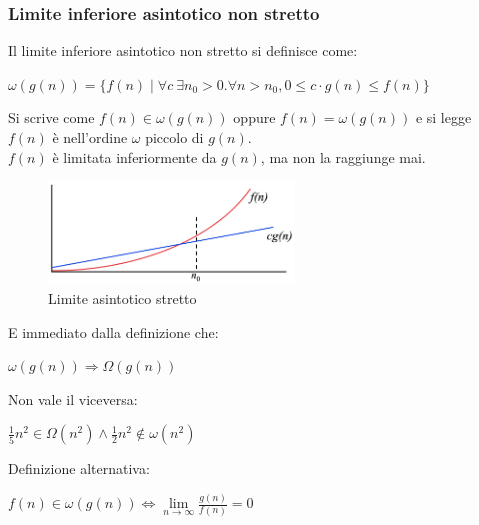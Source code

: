 \subsubsection{Limite inferiore asintotico non stretto}
\begin{definition}
	Il limite inferiore asintotico non stretto si definisce come:
	\begin{center}
		$\omega(g(n)) = \{f(n) \mid \forall c \: \exists n_0 > 0 . \forall n > n_0, 0 \leq c \cdot g(n) \leq f(n) \}$
	\end{center}
\end{definition}
\noindent Si scrive come $f(n) \in \omega(g(n))$ oppure $f(n) = \omega(g(n))$ e si legge $f(n)$ è nell'ordine $\omega$ piccolo di $g(n)$.\\
$f(n)$ è limitata inferiormente da $g(n)$, ma non la raggiunge mai.\\
\begin{figure}
	\vspace{-15pt}
	\centering
	\includegraphics[width=6.5cm]{images/limite-inferiore-asintotico-non-stretto.png}
	\vspace{-5pt}
	\caption{Limite asintotico stretto}
\end{figure}

\vspace{-15pt}
E immediato dalla definizione che:
\begin{center}
	$\omega(g(n)) \Longrightarrow \Omega(g(n))$
\end{center}
Non vale il viceversa: 
\begin{center}
	$\frac{1}{5}n^2 \in \Omega(n^2) \land \frac{1}{2}n^2 \notin \omega(n^2)$
\end{center}
Definizione alternativa:
\begin{center}
	$f(n) \in \omega(g(n)) \Longleftrightarrow \lim\limits_{n\to \infty}\frac{g(n)}{f(n)} = 0$
\end{center}

